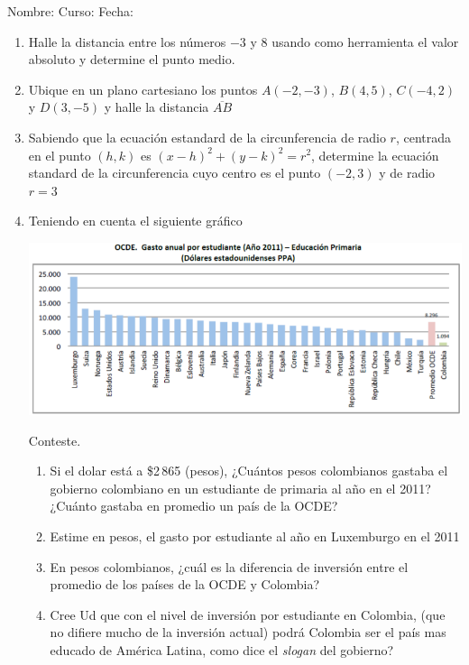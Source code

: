 \documentclass[fleqn]{article}
\newcommand{\LineaNombre}{%
\par
\vspace{\baselineskip}
Nombre:\hrulefill \; Curso: \underline{\hspace*{48pt}} \; Fecha: \underline{\hspace*{2.5cm}} \relax
\par}
\begin{document}
\LineaNombre
\begin{enumerate}
 \item Halle la distancia entre los números $-3$ y 8 usando como herramienta el valor absoluto y determine el punto medio.\noanswer
 \item Ubique en un plano cartesiano los puntos $A(-2,-3)$, $B(4,5)$, $C(-4,2)$ y $D(3,-5)$ y halle la distancia $\overline{AB}$
  \item Sabiendo que la ecuación estandard de la circunferencia de radio $r$, centrada en el punto $(h,k)$ es $(x-h)^{2}+(y-k)^{2}=r^{2}$, determine la ecuación standard de la circunferencia cuyo centro es el punto $(-2,3)$ y de radio $r=3$ \noanswer
 \item Teniendo en cuenta el siguiente gráfico
 \begin{center}
 \includegraphics[scale=.45]{Images/GastoEstudEducPrim.png} 
 \end{center}
 Conteste.
 \begin{enumerate}
 \item Si el dolar está a \$2\,865 (pesos), ¿Cuántos pesos colombianos gastaba el gobierno colombiano en un estudiante de primaria al año en el 2011? ¿Cuánto gastaba en promedio un país de la OCDE?
 \newpage
 \item Estime en pesos, el gasto por estudiante al año en Luxemburgo en el 2011 \noanswer
 \item En pesos colombianos, ¿cuál es la diferencia de inversión entre el promedio de los países de la OCDE y Colombia?\noanswer
 \item Cree Ud que con el nivel de inversión por estudiante en Colombia, (que no difiere mucho de la inversión actual) podrá Colombia ser el país mas educado de América Latina, como dice el \emph{slogan} del gobierno?\noanswer

\end{enumerate}
\end{enumerate}
\end{document}
